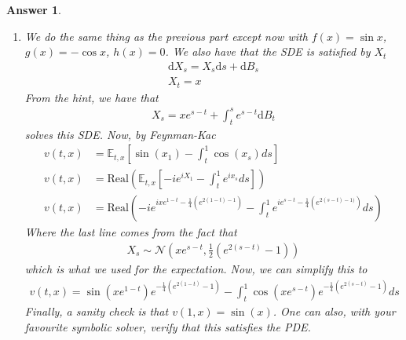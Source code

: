\documentclass[12pt]{article}
\theoremstyle{colon}
\newtheorem*{answer}{Answer}
\begin{document}
\begin{answer}
\begin{enumerate}[label=\alph*)]
    \item We do the same thing as the previous part except now with $f(x) = \sin x$, $g(x) = - \cos x$, $h(x) = 0$. We also have that the SDE is satisfied by $X_t$
      \begin{gather*}
        \text{d} X_s = X_s \text{d}s + \text{d} B_s \\
        X_t = x
      \end{gather*}
      From the hint, we have that
      \begin{gather*}
        X_s = x e^{s-t} + \int_t^s e^{s-t} \text{d} B_t
      \end{gather*}
      solves this SDE. Now, by Feynman-Kac
      \begin{align*}
        v(t,x) &= \mathbb{E}_{t,x}[\sin (x_1) - \int_t^1 \cos (x_s) ds] \\
        v(t,x) &= \text{Real} \left( \mathbb{E}_{t,x}[-i e^{i X_1} - \int_t^1 e^{i x_s} ds] \right) \\
        v(t,x) &= \text{Real} \left( -i e^{i x e^{1-t} - \frac{1}{4} (e^{2(1-t)-1})} - \int_t^1 e^{i e^{s-t} - \frac{1}{4}(e^{2(s-t) - 1)})} ds \right)
      \end{align*}
      Where the last line comes from the fact that
      \begin{gather*}
        X_s \sim \mathcal{N}(xe^{s-t}, \frac{1}{2} (e^{2(s-t)}-1))
      \end{gather*}
      which is what we used for the expectation. Now, we can simplify this to
      \begin{gather*}
        v(t,x) = \sin (x e^{1-t}) e^{-\frac{1}{4} (e^{2(1-t)}-1)} - \int_t^1 \cos(x e^{s-t}) e^{-\frac{1}{4}(e^{2(s-t)}-1)} ds
      \end{gather*}
      Finally, a sanity check is that $v(1,x) = \sin(x)$. One can also, with your favourite symbolic solver, verify that this satisfies the PDE.
  \end{enumerate}
\end{answer}

\clearpage
\end{document}
